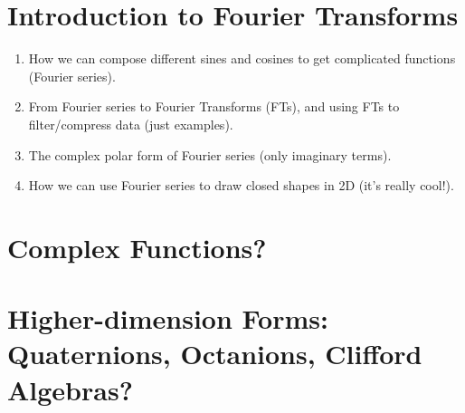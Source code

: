 \documentclass{article}
\begin{document}
\section{Introduction to Fourier Transforms}
\begin{enumerate}
	\item How we can compose different sines and cosines to get complicated functions (Fourier series).
	\item From Fourier series to Fourier Transforms (FTs), and using FTs to filter/compress data (just examples).
	\item The complex polar form of Fourier series (only imaginary terms).
	\item How we can use Fourier series to draw closed shapes in 2D (it's really cool!).
\end{enumerate}

\section{Complex Functions?}
\section{Higher-dimension Forms: Quaternions, Octanions, Clifford Algebras?}
\end{document}
